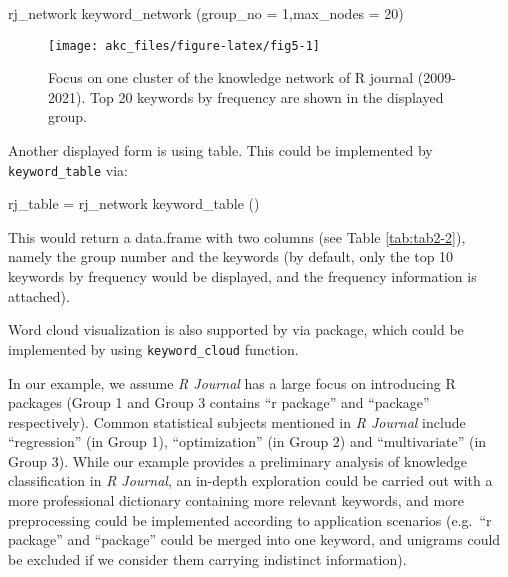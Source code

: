 \begin{Schunk}
\begin{Sinput}
rj_network %>%
  keyword_network (group_no = 1,max_nodes = 20)
\end{Sinput}
\begin{figure}

{\centering \texttt{[image: akc\_files/figure-latex/fig5-1]}

}

\caption[Focus on one cluster of the knowledge network of R journal (2009-2021)]{Focus on one cluster of the knowledge network of R journal (2009-2021). Top 20 keywords by frequency are shown in the displayed group.}\label{fig:fig5}
\end{figure}
\end{Schunk}

Another displayed form is using table. This could be implemented by
\texttt{keyword\_table} via:

\begin{Schunk}
\begin{Sinput}
rj_table = rj_network %>%
  keyword_table ()
\end{Sinput}
\end{Schunk}

This would return a data.frame with two columns (see Table
\ref{tab:tab2-2}), namely the group number and the keywords (by default,
only the top 10 keywords by frequency would be displayed, and the
frequency information is attached).



Word cloud visualization is also supported by  via
 package, which could be implemented by using
\texttt{keyword\_cloud} function.

In our example, we assume \emph{R Journal} has a large focus on
introducing R packages (Group 1 and Group 3 contains ``r package'' and
``package'' respectively). Common statistical subjects mentioned in
\emph{R Journal} include ``regression'' (in Group 1), ``optimization''
(in Group 2) and ``multivariate'' (in Group 3). While our example
provides a preliminary analysis of knowledge classification in \emph{R
Journal}, an in-depth exploration could be carried out with a more
professional dictionary containing more relevant keywords, and more
preprocessing could be implemented according to application scenarios
(e.g.~``r package'' and ``package'' could be merged into one keyword,
and unigrams could be excluded if we consider them carrying indistinct
information).

